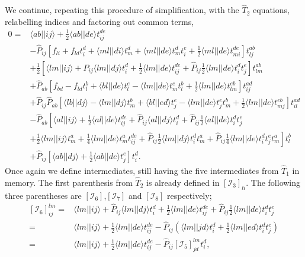 We continue, repeating this procedure of simplification, with the $\hat{T}_2$ equations, relabelling indices and factoring out common terms,
\begin{equation}
\label{eq:CC:t2eq_raw}
\begin{split}
0 =&
\langle ab || ij \rangle
+\frac{1}{2} \langle ab||de \rangle t_{ij}^{de}
\\
&
- \hat{P}_{ij} \left[
f_{li} + f_{ld} t_{i}^d + \langle ml||di \rangle t_m^d + \langle ml||de \rangle t_m^d t_i^e 
+\frac{1}{2}\langle ml||de \rangle t_{mi}^{de}  
\right] t_{lj}^{ab}
\\
&
+ \frac{1}{2} \left[
\langle lm||ij \rangle + \hat{P}_{ij} \langle lm||dj \rangle t_i^d 
+\frac{1}{2} \langle lm||de \rangle t_{ij}^{de} +\hat{P}_{ij} \frac{1}{2} \langle lm||de \rangle t_i^d t_j^e 
\right]  t_{lm}^{ab}
\\
&
+ \hat{P}_{ab} \left[
f_{bd} - f_{ld} t_l^b + \langle bl||de \rangle t_l^e - \langle lm||de \rangle t_m^e t_l^b 
+ \frac{1}{2} \langle lm||de \rangle t_{lm}^{eb}
\right] t_{ij}^{ad} 
\\
&
+\hat{P}_{ij} \hat{P}_{ab} \left[
\langle lb||dj \rangle - \langle lm||dj \rangle t_{m}^b + \langle bl||ed \rangle t_{j}^e
- \langle lm||de \rangle t_j^e t_m^b + \frac{1}{2} \langle lm||de \rangle t_{mj}^{eb}
\right] t_{il}^{ad}
\\
&
-\hat{P}_{ab} \left[
\langle al||ij \rangle + \frac{1}{2} \langle al||de \rangle t_{ij}^{de} 
+ \hat{P}_{ij} \langle al||dj \rangle t_i^d 
+ \hat{P}_{ij} \frac{1}{2} \langle al||de \rangle t_i^d t_j^e \right.
\\&
\left. + \frac{1}{2} \langle lm||ij \rangle t_m^a
+ \frac{1}{4} \langle lm||de \rangle t_m^a t_{ij}^{de} 
+ \hat{P}_{ij} \frac{1}{2} \langle lm||dj \rangle t_i^d t_m^a
+ \hat{P}_{ij} \frac{1}{4} \langle lm||de \rangle t_i^d t_j^e t_m^a
\right] t_l^b
\\
&
+ \hat{P}_{ij} \left[
\langle ab || dj \rangle + \frac{1}{2} \langle ab||de \rangle t_j^e
\right] t_i^d .
\end{split}
\end{equation}
Once again we define intermediates, still having the five intermediates from $\hat{T}_1$ in memory.
The first parenthesis from $\hat{T}_2$ is already defined in $\left[\mathcal{I}_3\right]_{li}$.
The following three parentheses are $\left[\mathcal{I}_6\right]$,$\left[\mathcal{I}_7\right]$ and $\left[\mathcal{I}_8\right]$ respectively;
\begin{equation}
\begin{split}
\left[\mathcal{I}_6\right]_{ij}^{lm} 
=& 
\langle lm||ij \rangle + \hat{P}_{ij} \langle lm||dj \rangle t_i^d 
+\frac{1}{2} \langle lm||de \rangle t_{ij}^{de} +\hat{P}_{ij} \frac{1}{2} \langle lm||de \rangle t_i^d t_j^e 
\\
=&
\langle lm||ij \rangle 
+\frac{1}{2} \langle lm||de \rangle t_{ij}^{de} 
- \hat{P}_{ij} \left( \langle lm||jd \rangle t_i^d + \frac{1}{2} \langle lm||ed \rangle t_i^d t_j^e \right)
\\
=&
\langle lm||ij \rangle 
+\frac{1}{2} \langle lm||de \rangle t_{ij}^{de}
- \hat{P}_{ij} \left[\mathcal{I}_5\right]_{jd}^{lm} t_i^d ,
\end{split}
\end{equation}

